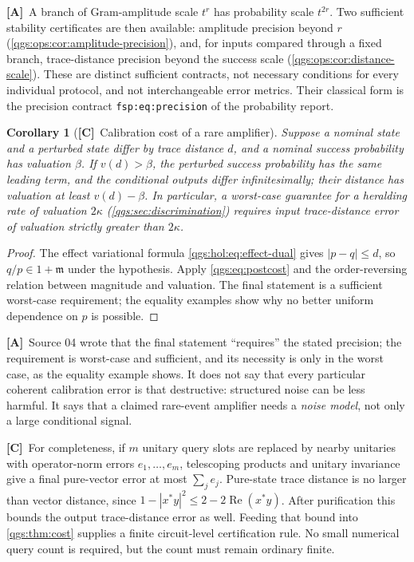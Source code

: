 \documentclass[11pt,oneside]{article}
\numberwithin{equation}{section}
\theoremstyle{plain}
\newtheorem{corollary}[corollary]{Corollary}
\theoremstyle{definition}
\theoremstyle{remark}
\newcommand{\mm}{\mathfrak m}
\DeclareMathOperator{\Rea}{Re}
\newcommand{\abs}[1]{\left|#1\right|}
\newcommand{\TC}{\textcolor{TierC}{\textsf{\bfseries[C]}}}
\newcommand{\TA}{\textcolor{TierA}{\textsf{\bfseries[A]}}}
\begin{document}
\TA\ A branch of Gram-amplitude scale $t^r$ has probability scale $t^{2r}$. Two sufficient stability certificates are then available: amplitude precision beyond $r$ (\cref{qgs:ops:cor:amplitude-precision}), and, for inputs compared through a fixed branch, trace-distance precision beyond the success scale (\cref{qgs:ops:cor:distance-scale}). These are distinct sufficient contracts, not necessary conditions for every individual protocol, and not interchangeable error metrics. Their classical form is the precision contract \texttt{fsp:eq:precision} of the probability report.

\begin{corollary}[\TC\ Calibration cost of a rare amplifier]\label{qgs:hol:cor:calibration}
Suppose a nominal state and a perturbed state differ by trace distance $d$, and a nominal success probability has valuation $\beta$. If $v(d)>\beta$, the perturbed success probability has the same leading term, and the conditional outputs differ infinitesimally; their distance has valuation at least $v(d)-\beta$. In particular, a worst-case guarantee for a heralding rate of valuation $2\kappa$ (\cref{qgs:sec:discrimination}) requires input trace-distance error of valuation strictly greater than $2\kappa$.
\end{corollary}
\begin{proof}
The effect variational formula \eqref{qgs:hol:eq:effect-dual} gives $\abs{p-q}\le d$, so $q/p\in1+\mm$ under the hypothesis. Apply \eqref{qgs:eq:postcost} and the order-reversing relation between magnitude and valuation. The final statement is a sufficient worst-case requirement; the equality examples show why no better uniform dependence on $p$ is possible.
\end{proof}

\TA\ Source 04 wrote that the final statement ``requires'' the stated precision; the requirement is worst-case and sufficient, and its necessity is only in the worst case, as the equality example shows. It does not say that every particular coherent calibration error is that destructive: structured noise can be less harmful. It says that a claimed rare-event amplifier needs a \emph{noise model}, not only a large conditional signal.

\TC\ For completeness, if $m$ unitary query slots are replaced by nearby unitaries with operator-norm errors $e_1,\ldots,e_m$, telescoping products and unitary invariance give a final pure-vector error at most $\sum_je_j$. Pure-state trace distance is no larger than vector distance, since $1-\abs{x^*y}^2\le2-2\Rea(x^*y)$. After purification this bounds the output trace-distance error as well. Feeding that bound into \cref{qgs:thm:cost} supplies a finite circuit-level certification rule. No small numerical query count is required, but the count must remain ordinary finite.
\end{document}
